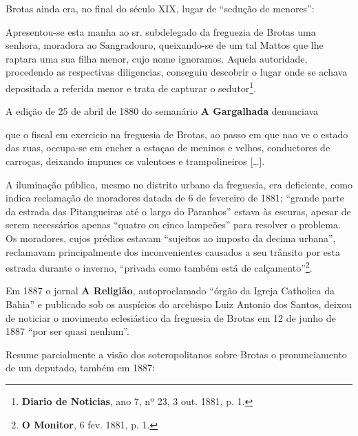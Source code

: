 Brotas ainda era, no final do século XIX, lugar de ``sedução de menores'':

\begin{citacao}
Apresentou-se esta manha ao sr. subdelegado da freguezia de Brotas uma senhora, moradora ao Sangradouro, queixando-se de um tal Mattos que lhe raptara uma sua filha menor, cujo nome ignoramos. Aquela autoridade, procedendo as respectivas diligencias, conseguiu descobrir o lugar onde se achava depositada a referida menor e trata de capturar o sedutor\footnote{ \textbf{Diario de Noticias}, ano 7, nº 23, 3 out. 1881, p. 1.}.
\end{citacao}

A edição de 25 de abril de 1880 do semanário \textbf{A Gargalhada} denunciava

\begin{citacao}
que o fiscal em exercicio na freguesia de Brotas, ao passo em que nao ve o estado das ruas, occupa-se em encher a estaçao de meninos e velhos, conductores de carroças, deixando impunes os valentoes e trampolineiros [\dots].
\end{citacao}

A iluminação pública, mesmo no distrito urbano da freguesia, era deficiente, como indica reclamação de moradores datada de 6 de fevereiro de 1881; ``grande parte da estrada das Pitangueiras até o largo do Paranhos'' estava às escuras, apesar de serem necessários apenas ``quatro ou cinco lampeões'' para resolver o problema. Os moradores, cujos prédios estavam ``sujeitos ao imposto da decima urbana'', reclamavam principalmente dos inconvenientes causados a seu trânsito por esta estrada durante o inverno, ``privada como também está de calçamento''\footnote{\textbf{O Monitor}, 6 fev. 1881, p. 1.}.

Em 1887 o jornal \textbf{A Religião}, autoproclamado ``órgão da Igreja Catholica da Bahia'' e publicado sob os auspícios do arcebispo Luiz Antonio dos Santos, deixou de noticiar o movimento eclesiástico da freguesia de Brotas em 12 de junho de 1887 ``por ser quasi nenhum''.

Resume parcialmente a visão dos soteropolitanos sobre Brotas o pronunciamento de um deputado, também em 1887:

